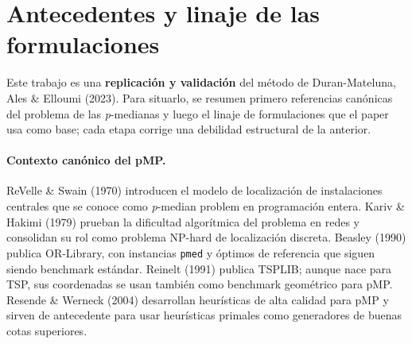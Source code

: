 \section{Antecedentes y linaje de las formulaciones}
\label{sec:literatura}

Este trabajo es una \textbf{replicación y validación} del método de Duran-Mateluna, Ales \&
Elloumi (2023). Para situarlo, se resumen primero referencias canónicas del problema de las
\textit{p}-medianas y luego el linaje de formulaciones que el paper usa como base; cada etapa
corrige una debilidad estructural de la anterior.

\paragraph{Contexto canónico del pMP.} ReVelle \& Swain (1970) introducen el modelo de
localización de instalaciones centrales que se conoce como \textit{p}-median problem en
programación entera. Kariv \& Hakimi (1979) prueban la dificultad algorítmica del problema en
redes y consolidan su rol como problema NP-hard de localización discreta. Beasley (1990) publica
OR-Library, con instancias \texttt{pmed} y óptimos de referencia que siguen siendo benchmark
estándar. Reinelt (1991) publica TSPLIB; aunque nace para TSP, sus coordenadas se usan también
como benchmark geométrico para pMP. Resende \& Werneck (2004) desarrollan heurísticas de alta
calidad para pMP y sirven de antecedente para usar heurísticas primales como generadores de
buenas cotas superiores.

